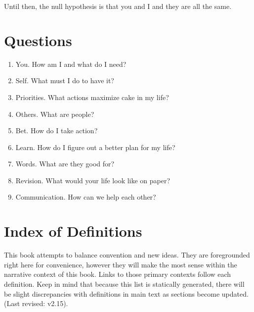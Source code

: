 \documentclass[
]{book}
\providecommand{\tightlist}{%
  \setlength{\itemsep}{0pt}\setlength{\parskip}{0pt}}
\begin{document}
Until then, the null hypothesis is that you and I and they are all the same.

\hypertarget{questions}{%
\section{Questions}\label{questions}}

\begin{enumerate}
\def\labelenumi{\arabic{enumi}.}
\tightlist
\item
  You. How am I and what do I need?
\item
  Self. What must I do to have it?
\item
  Priorities. What actions maximize cake in my life?\\
\item
  Others. What are people?\\
\item
  Bet. How do I take action?\\
\item
  Learn. How do I figure out a better plan for my life?\\
\item
  Words. What are they good for?\\
\item
  Revision. What would your life look like on paper?
\item
  Communication. How can we help each other?
\end{enumerate}

\hypertarget{index-of-definitions}{%
\section{Index of Definitions}\label{index-of-definitions}}

This book attempts to balance convention and new ideas. They are foregrounded right here for convenience, however they will make the most sense within the narrative context of this book. Links to those primary contexts follow each definition. Keep in mind that because this list is statically generated, there will be slight discrepancies with definitions in main text as sections become updated. (Last revised: v2.15).
\end{document}
